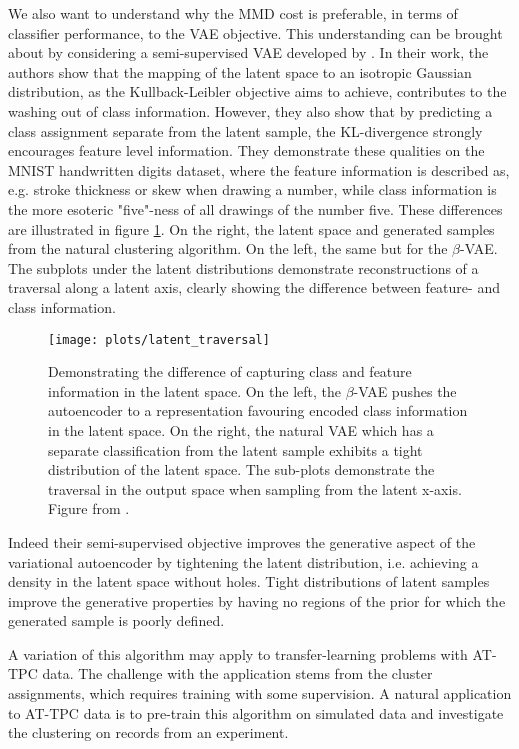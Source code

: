 We also want to understand why the MMD cost is preferable, in terms of classifier performance, to the VAE objective. This understanding can be brought about by considering a semi-supervised VAE developed by \citet{Antoran2019}. In their work, the authors show that the mapping of the latent space to an isotropic Gaussian distribution, as the Kullback-Leibler objective aims to achieve, contributes to the washing out of class information. However, they also show that by predicting a class assignment separate from the latent sample, the KL-divergence strongly encourages feature level information. They demonstrate these qualities on the MNIST handwritten digits dataset, where the feature information is described as, e.g. stroke thickness or skew when drawing a number, while class information is the more esoteric "five"-ness of all drawings of the number five. These differences are illustrated in figure \ref{fig:latent_traversal}. On the right, the latent space and generated samples from the natural clustering algorithm. On the left, the same but for the $\beta$-VAE. The subplots under the latent distributions demonstrate reconstructions of a traversal along a latent axis, clearly showing the difference between feature- and class information. 



\begin{figure}
\centering
\texttt{[image: plots/latent\_traversal]}
\caption[Difference between generative and discriminative latent spaces]{Demonstrating the difference of capturing class and feature information in the latent space. On the left, the $\beta$-VAE pushes the autoencoder to a representation favouring encoded class information in the latent space. On the right, the natural VAE which has a separate classification from the latent sample exhibits a tight distribution of the latent space. The sub-plots demonstrate the traversal in the output space when sampling from the latent x-axis. Figure from \citet{Antoran2019}.}\label{fig:latent_traversal}
\end{figure}

Indeed their semi-supervised objective improves the generative aspect of the variational autoencoder by tightening the latent distribution, i.e. achieving a density in the latent space without holes. Tight distributions of latent samples improve the generative properties by having no regions of the prior for which the generated sample is poorly defined. 

A variation of this algorithm may apply to transfer-learning problems with AT-TPC data. The challenge with the application stems from the cluster assignments, which requires training with some supervision. A natural application to AT-TPC data is to pre-train this algorithm on simulated data and investigate the clustering on records from an experiment. 

